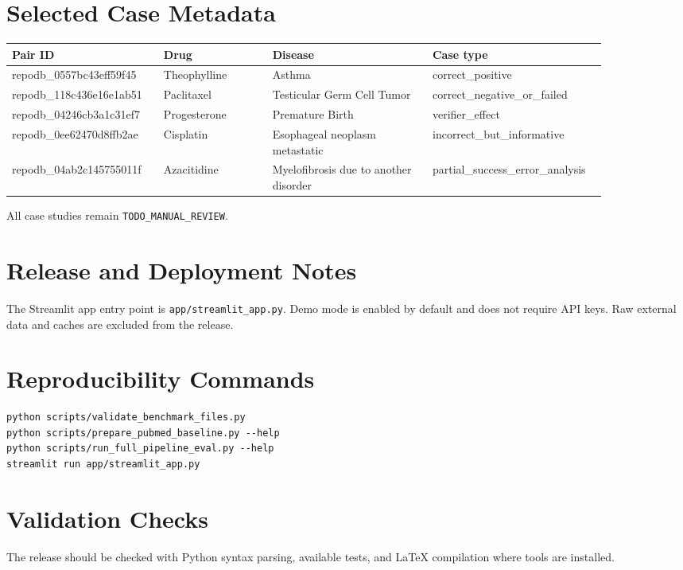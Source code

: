\documentclass[11pt]{article}
\begin{document}
\section{Selected Case Metadata}
\begin{longtable}{p{0.23\linewidth}p{0.17\linewidth}p{0.25\linewidth}p{0.22\linewidth}}
\toprule
Pair ID & Drug & Disease & Case type \\
\midrule
repodb\_0557bc43eff59f45 & Theophylline & Asthma & correct\_positive \\
repodb\_118c436e16e1ab51 & Paclitaxel & Testicular Germ Cell Tumor & correct\_negative\_or\_failed \\
repodb\_04246cb3a1c31ef7 & Progesterone & Premature Birth & verifier\_effect \\
repodb\_0ee62470d8ffb2ae & Cisplatin & Esophageal neoplasm metastatic & incorrect\_but\_informative \\
repodb\_04ab2c145755011f & Azacitidine & Myelofibrosis due to another disorder & partial\_success\_error\_analysis \\
\bottomrule
\end{longtable}

All case studies remain \texttt{TODO\_MANUAL\_REVIEW}.

\section{Release and Deployment Notes}
The Streamlit app entry point is \texttt{app/streamlit\_app.py}. Demo mode is enabled by default and does not require API keys. Raw external data and caches are excluded from the release.

\section{Reproducibility Commands}
\begin{verbatim}
python scripts/validate_benchmark_files.py
python scripts/prepare_pubmed_baseline.py --help
python scripts/run_full_pipeline_eval.py --help
streamlit run app/streamlit_app.py
\end{verbatim}

\section{Validation Checks}
The release should be checked with Python syntax parsing, available tests, and LaTeX compilation where tools are installed.
\end{document}
